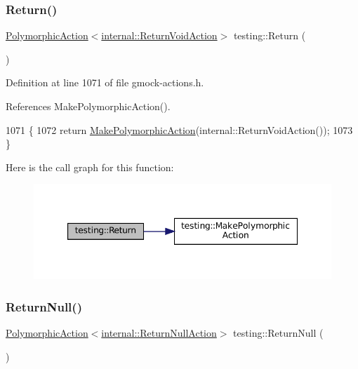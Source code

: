 \subsubsection{\texorpdfstring{Return()}{Return()}\hspace{0.1cm}{\footnotesize\ttfamily [2/2]}}
{\footnotesize\ttfamily \hyperlink{classtesting_1_1PolymorphicAction}{Polymorphic\+Action}$<$\hyperlink{classtesting_1_1internal_1_1ReturnVoidAction}{internal\+::\+Return\+Void\+Action}$>$ testing\+::\+Return (\begin{DoxyParamCaption}{ }\end{DoxyParamCaption})\hspace{0.3cm}{\ttfamily [inline]}}



Definition at line 1071 of file gmock-\/actions.\+h.



References Make\+Polymorphic\+Action().


\begin{DoxyCode}
1071                                                             \{
1072   \textcolor{keywordflow}{return} \hyperlink{namespacetesting_a36bd06c5ea972c6df0bd9f40a7a94c65}{MakePolymorphicAction}(internal::ReturnVoidAction());
1073 \}
\end{DoxyCode}
Here is the call graph for this function\+:
\nopagebreak
\begin{figure}[H]
\begin{center}
\leavevmode
\includegraphics[width=347pt]{namespacetesting_a8da8e53d2e7bc4e3c531f7435ad04823_cgraph}
\end{center}
\end{figure}
\mbox{\label{namespacetesting_aa0331596e269114da101f810d3a1b88b}} 
\subsubsection{\texorpdfstring{Return\+Null()}{ReturnNull()}}
{\footnotesize\ttfamily \hyperlink{classtesting_1_1PolymorphicAction}{Polymorphic\+Action}$<$\hyperlink{classtesting_1_1internal_1_1ReturnNullAction}{internal\+::\+Return\+Null\+Action}$>$ testing\+::\+Return\+Null (\begin{DoxyParamCaption}{ }\end{DoxyParamCaption})\hspace{0.3cm}{\ttfamily [inline]}}



